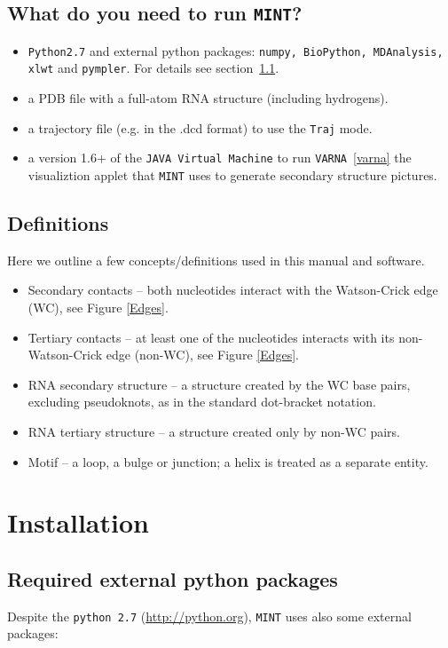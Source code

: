 \documentclass[12pt]{article}
\begin{document}
\subsection{What do you need to run {\tt MINT}?}
\begin{itemize}
\item {\tt Python2.7} and external python packages: {\tt  numpy, BioPython, MDAnalysis, xlwt} and {\tt  pympler}. For details see section~\ref{external_pack}.
\item a PDB file with a full-atom RNA structure (including hydrogens).
\item a trajectory file (e.g. in the .dcd format) to use the {\tt Traj} mode.
\item a version 1.6+ of the {\tt JAVA Virtual Machine} to run {\tt VARNA}~\ref{varna} the visualiztion applet that {\tt MINT} uses to generate secondary structure pictures.
\end{itemize}

\subsection{Definitions}
Here we outline a few concepts/definitions used in this manual and software. 
\begin{itemize} 
\item Secondary contacts -- both nucleotides interact with the Watson-Crick edge (WC), see Figure \ref{Edges}.
\item Tertiary contacts -- at least one of the nucleotides interacts with its non-Watson-Crick edge (non-WC), see Figure \ref{Edges}.
\item RNA secondary structure -- a structure created by the WC base pairs, excluding pseudoknots, as in the standard dot-bracket notation.
\item RNA tertiary structure -- a structure created only by non-WC pairs.
\item Motif -- a loop, a bulge or junction; a helix is treated as a separate entity.
\end{itemize}

\section{Installation} \label{external}
\subsection{Required external python packages} \label{external_pack}
Despite the {\tt python 2.7} (\url{http://python.org}), {\tt MINT} uses also some external packages:
\end{document}
